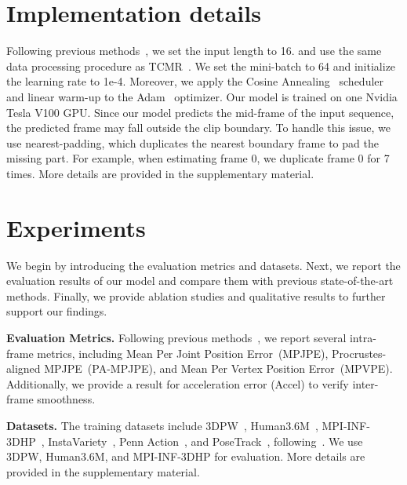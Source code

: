 \documentclass[10pt,twocolumn,letterpaper]{article}
\begin{document}
	\section{Implementation details}
	Following previous methods~\cite{VIBE, TCMR, MPS-net}, we set the input length  to 16. and use the same data processing procedure as TCMR~\cite{TCMR}. We set the mini-batch  to 64 and initialize the learning rate to 1e-4. Moreover, we apply the Cosine Annealing~\cite{IlyaLoshchilov2016SGDRSG} scheduler and linear warm-up to the Adam~\cite{DiederikPKingma2014AdamAM} optimizer. Our model is trained on one Nvidia Tesla V100 GPU. Since our model predicts the mid-frame of the input sequence, the predicted frame may fall outside the clip boundary. To handle this issue, we use nearest-padding, which duplicates the nearest boundary frame to pad the missing part. For example, when estimating frame 0, we duplicate frame 0 for 7 times. 
	More details are provided in the supplementary material.
	
	\section{Experiments}
	We begin by introducing the evaluation metrics and datasets. Next, we report the evaluation results of our model and compare them with previous state-of-the-art methods. Finally, we provide ablation studies and qualitative results to further support our findings.
	
	\noindent\textbf{Evaluation Metrics.} Following previous methods~\cite{Insta, VIBE, TCMR, MPS-net}, we report several intra-frame metrics, including Mean Per Joint Position Error~(MPJPE), Procrustes-aligned MPJPE~(PA-MPJPE), and Mean Per Vertex Position Error~(MPVPE). Additionally, we provide a result for acceleration error (Accel) to verify inter-frame smoothness.
	
	\noindent\textbf{Datasets.} The training datasets include 3DPW~\cite{3DPW}, Human3.6M~\cite{HMR}, MPI-INF-3DHP~\cite{MPII3D}, InstaVariety~\cite{Insta}, Penn Action~\cite{Penn}, and PoseTrack~\cite{PoseTrack}, following~\cite{TCMR}. We use 3DPW, Human3.6M, and MPI-INF-3DHP for evaluation. More details are provided in the supplementary material.
	
\end{document}
